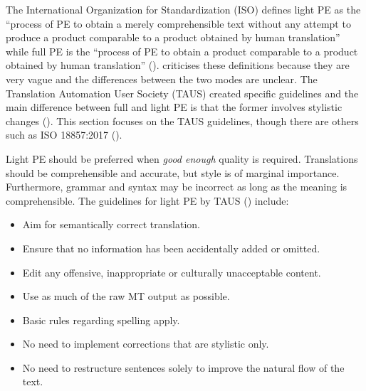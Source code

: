 The International Organization for Standardization (ISO) defines light PE as the ``process of PE to obtain a merely comprehensible text without any attempt to produce a product comparable to a product obtained by human translation'' while full PE is the ``process of PE to obtain a product comparable to a product obtained by human translation'' (\cite{ISO}). \textcite[107f]{o2022deal} criticises these definitions because they are very vague and the differences between the two modes are unclear. The Translation Automation User Society (TAUS) created specific guidelines and the main difference between full and light PE is that the former involves stylistic changes (\cite{massardo2016mt}). This section focuses on the TAUS guidelines, though there are others such as ISO 18857:2017 (\cite{ISO}). 

Light PE should be preferred when \textit{good enough} quality is required. Translations should be comprehensible and accurate, but style is of marginal importance. Furthermore, grammar and syntax may be incorrect as long as the meaning is comprehensible. The guidelines for light PE by TAUS (\cite{massardo2016mt}) include:

\begin{itemize}
\setlength\itemsep{-0.5em}

    \item Aim for semantically correct translation.
    \item Ensure that no information has been accidentally added or omitted.
    \item Edit any offensive, inappropriate or culturally unacceptable content.
    \item Use as much of the raw MT output as possible.
    \item Basic rules regarding spelling apply.
    \item No need to implement corrections that are stylistic only.
    \item No need to restructure sentences solely to improve the natural flow of the text.
\end{itemize}


